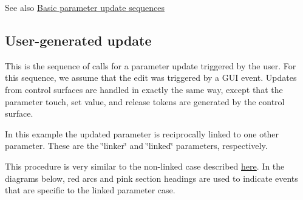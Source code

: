 \begin{DoxySeeAlso}{See also}
\hyperlink{a00353}{Basic parameter update sequences}
\end{DoxySeeAlso}
\hypertarget{a00355_linkedParameters_sequences_user_gui}{}\subsection{User-\/generated update}\label{a00355_linkedParameters_sequences_user_gui}
This is the sequence of calls for a parameter update triggered by the user. For this sequence, we assume that the edit was triggered by a G\+U\+I event. Updates from control surfaces are handled in exactly the same way, except that the parameter touch, set value, and release tokens are generated by the control surface.

In this example the updated parameter is reciprocally linked to one other parameter. These are the \char`\"{}linker\char`\"{} and \char`\"{}linked\char`\"{} parameters, respectively.

This procedure is very similar to the non-\/linked case described \hyperlink{a00353_parameterUpdates_sequences_user}{here}. In the diagrams below, red arcs and pink section headings are used to indicate events that are specific to the linked parameter case.

